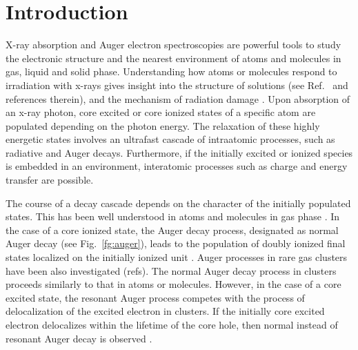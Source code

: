 \section{Introduction}

X-ray absorption and Auger electron spectroscopies are powerful tools to study the electronic structure and the nearest environment of atoms and molecules in gas, liquid and solid phase. Understanding how atoms or molecules respond to irradiation with x-rays gives insight into the structure of solutions (see Ref.\ \citep{smith17:13909} and references therein), and the mechanism of radiation damage \citep{ONeill02:329,Carugo05:213,Stumpf16:237}. Upon absorption of an x-ray photon, core excited or core ionized states of a specific atom are populated depending on the photon energy. The relaxation of these highly energetic states involves an ultrafast cascade of intraatomic processes, such as radiative and Auger decays. Furthermore, if the initially excited or ionized species is embedded in an environment, interatomic processes such as charge and energy transfer \citep{Pokapanich09:7264,Pokapanich11:13430,Stumpf16:237,unger17:708,ceolin17:263003} are possible.


The course of a decay cascade depends on the character of the initially populated states. This has been well understood in atoms and molecules in gas phase  \citep{stoychev08:074307,Demekhin08:043421,Demekhin09:104303,Ouchi11:053415,Miteva14:164303,travnikova16:213001}. In the case of a core ionized state, the Auger decay process, designated as normal Auger decay (see Fig.\ \ref{fg:auger}), leads to the population of doubly ionized final states localized on the initially ionized unit \citep{stoychev08:074307,Demekhin08:043421,Demekhin09:104303,Ouchi11:053415}. Auger processes in rare gas clusters have been also investigated (refs). The normal Auger decay process in clusters proceeds similarly to that in atoms or molecules. However, in the case of a core excited state, the resonant Auger process competes with the process of delocalization of the excited electron in clusters. If the initially core excited electron delocalizes within the lifetime of the core hole, then normal instead of resonant Auger decay is observed \citep{Bjorneholm95:3017}. 



